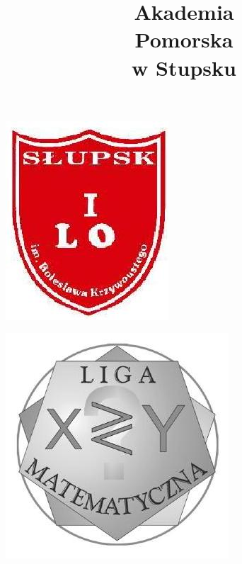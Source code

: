 \documentclass[10pt]{article}
\title{Akademia \\
 Pomorska \\
 w Stupsku }
\author{}
\date{}
\begin{document}
\maketitle
\begin{center}
\includegraphics[max width=\textwidth]{2024_11_21_c95e3a31bf28f502ba26g-1(1)}
\end{center}

\begin{center}
\includegraphics[max width=\textwidth]{2024_11_21_c95e3a31bf28f502ba26g-1}
\end{center}
\end{document}
